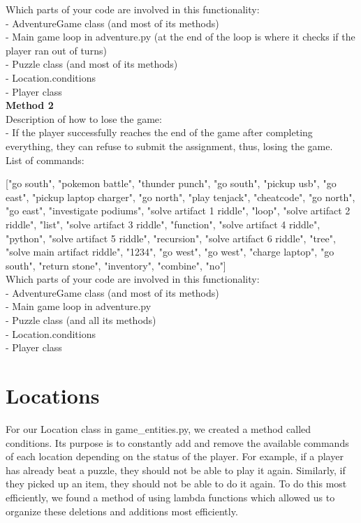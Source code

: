 \documentclass[11pt]{article}
\begin{document}
Which parts of your code are involved in this functionality: \\
- AdventureGame class (and most of its methods) \\
- Main game loop in adventure.py (at the end of the loop is where it checks if the player ran out of turns)\\
- Puzzle class (and most of its methods) \\
- Location.conditions \\
- Player class \\

\textbf{Method 2 \\}
Description of how to lose the game: \\
- If the player successfully reaches the end of the game after completing everything, they can refuse to submit the assignment, thus, losing the game. \\
List of commands:

["go south", "pokemon battle", "thunder punch", "go south", "pickup usb", "go east", "pickup laptop charger", "go north", "play tenjack", "cheatcode", "go north", "go east", "investigate podiums", "solve artifact 1 riddle", "loop", "solve artifact 2 riddle", "list", "solve artifact 3 riddle", "function", "solve artifact 4 riddle", "python", "solve artifact 5 riddle", "recursion", "solve artifact 6 riddle", "tree", "solve main artifact riddle", "1234", "go west", "go west", "charge laptop", "go south", "return stone", "inventory", "combine", "no"] \\

Which parts of your code are involved in this functionality: \\
- AdventureGame class (and most of its methods) \\
- Main game loop in adventure.py \\
- Puzzle class (and all its methods) \\
- Location.conditions \\
- Player class \\

\section*{Locations}
For our Location class in game\_entities.py, we created a method called conditions. Its purpose is to constantly add and remove the available commands of each location depending on the status of the player. For example, if a player has already beat a puzzle, they should not be able to play it again. Similarly, if they picked up an item, they should not be able to do it again. To do this most efficiently, we found a method of using lambda functions which allowed us to organize these deletions and additions most efficiently.
\end{document}
